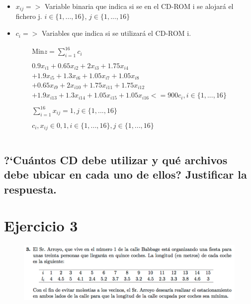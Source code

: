 \documentclass[10pt, a4paper]{article}
\begin{document}
			\begin{itemize}

				\item \(x_{ij} => \) Variable binaria que indica si se en el CD-ROM i se alojará el fichero j.  $i \in \{1,...,16\}$, $j \in \{1,...,16\}$

				\item \(c_{i} => \) Variables que indica si se utilizará el CD-ROM i.
			\end{itemize}
			\[
				\begin{split}
					\text{Min} z = \sum_{i=1}^{16} c_{i} \\ \\
						0.9x_{i1} + 0.65x_{i2} + 2x_{i3} + 1.75x_{i4} \\
						+ 1.9x_{i5} + 1.3x_{i6} + 1.05 x_{i7} + 1.05 x_{i8} \\
						+ 0.65x_{i9} + 2x_{i10} + 1.75x_{i11}  + 1.75x_{i12}\\
						+ 1.9x_{i13} + 1.3x_{i14} + 1.05 x_{i15} + 1.05 x_{i16} <= 900c_{i}, i \in \{1,...,16\}\\ \\
					 	\sum_{i=1}^{16} x_{ij} = 1, j \in \{1,...,16\}\\ \\
						c_{i}, x_{ij} \in {0,1}, i \in \{1,...,16\},j \in \{1,...,16\}\\ \\
				\end{split}
			\]
		\subsection{?`Cuántos CD debe utilizar y qué archivos debe ubicar en cada uno de ellos? Justificar la respuesta.}




	\section{Ejercicio 3}

        \begin{figure}[H]
        \centering
            \includegraphics[width=\textwidth]{res/exercise-3.png}
        \end{figure}
\end{document}
